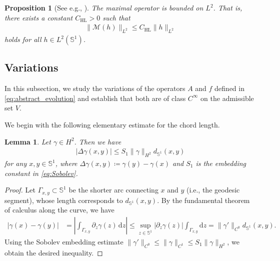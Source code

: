 \documentclass{article}
\newtheorem{lemma}[theorem]{Lemma}
\newtheorem{proposition}[theorem]{Proposition}
\theoremstyle{remark}
\theoremstyle{definition}
\numberwithin{equation}{section}
\begin{document}
\begin{proposition}[{See e.g., \cite[Theorem 1 in Chapter~I, Section~1]{stein1970singular}}]
    \label{prop:HL}
    The maximal operator is bounded on $L^2$. That is, there exists a constant $C_{\mathrm{HL}}>0$ such that
    \begin{align*}
        \|\mathcal{M}(h)\|_{L^2} \le C_{\mathrm{HL}}\|h\|_{L^2}
    \end{align*}
    holds for all $h\in L^2(\mathbb{S}^1)$.
\end{proposition}


\subsection{Variations}
\label{subsubsec:Variations}

In this subsection, we study the variations of the operators $A$ and $f$ defined in \eqref{eq:abstract_evolution} and establish that both are of class $C^\infty$ on the admissible set $V$.

We begin with the following elementary estimate for the chord length.

\begin{lemma}
    \label{lem:delta}
    Let $\gamma\in H^2$. Then we have
    \begin{align*}
        |\Delta\gamma(x,y)|\le S_1\|\gamma\|_{H^2}d_{\mathbb{S}^1}(x,y)
    \end{align*}
    for any $x,y\in\mathbb{S}^1$, where $\Delta\gamma(x,y) \coloneqq \gamma(y) - \gamma(x)$ and $S_1$ is the embedding constant in \eqref{eq:Sobolev}.
\end{lemma}

\begin{proof}
    Let $\Gamma_{x,y} \subset \mathbb{S}^1$ be the shorter arc connecting $x$ and $y$ (i.e., the geodesic segment), whose length corresponds to $d_{\mathbb{S}^1}(x,y)$.
    By the fundamental theorem of calculus along the curve, we have
    \begin{align*}
        |\gamma(x) - \gamma(y)|
        &= \left| \int_{\Gamma_{x,y}} \partial_z \gamma(z) \, \mathrm{d}z \right|
        \le \sup_{z \in \mathbb{S}^1} |\partial_z \gamma(z)| \int_{\Gamma_{x,y}} \mathrm{d}z
        = \|\gamma'\|_{C^0} d_{\mathbb{S}^1}(x,y).
    \end{align*}
    Using the Sobolev embedding estimate $\|\gamma'\|_{C^0} \le \|\gamma\|_{C^1} \le S_1 \|\gamma\|_{H^2}$, we obtain the desired inequality.
\end{proof}
\end{document}
